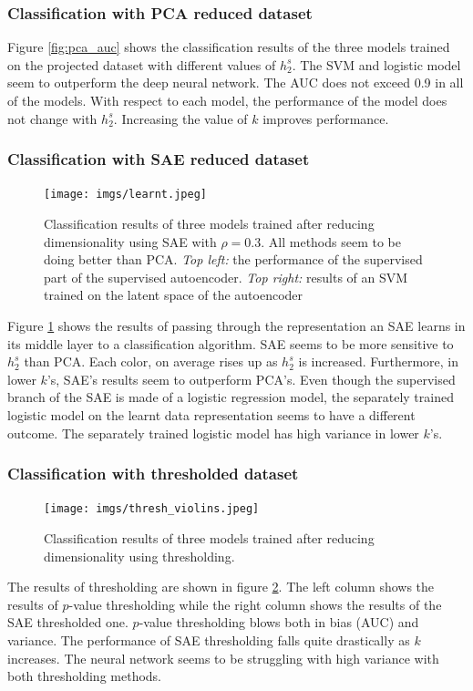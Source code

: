 \documentclass{article}
\begin{document}
\subsubsection{Classification with PCA reduced dataset}
Figure \ref{fig:pca_auc} shows the classification results of the three models trained on the projected dataset with different values of $h_2^s$. The SVM and logistic model seem to outperform the deep neural network. The AUC does not exceed 0.9 in all of the models. With respect to each model, the performance of the model does not change with $h_2^s.$ Increasing the value of $k$ improves performance. 
\subsubsection{Classification with SAE reduced dataset}
\begin{figure}[t]
    \centering
    \texttt{[image: imgs/learnt.jpeg]}
    \caption{Classification results of three models trained after reducing dimensionality using SAE with $\rho=0.3$. All methods seem to be doing better than PCA. \emph{Top left:} the performance of the supervised part of the supervised autoencoder. \emph{Top right:} results of an SVM trained on the latent space of the autoencoder}
    \label{fig:sae_auc}
\end{figure}
Figure \ref{fig:sae_auc} shows the results of passing through the representation an SAE learns in its middle layer to a classification algorithm. SAE seems to be more sensitive to $h_2^s$ than PCA. Each color, on average rises up as $h_2^s$ is increased. Furthermore, in lower $k$'s, SAE's results seem to outperform PCA's. Even though the supervised branch of the SAE is made of a logistic regression model, the separately trained logistic model on the learnt data representation seems to have a different outcome. The separately trained logistic model has high variance in lower $k$'s.

\subsubsection{Classification with thresholded dataset}
\begin{figure}[t]
    \centering
    \texttt{[image: imgs/thresh\_violins.jpeg]}
    \caption{Classification results of three models trained after reducing dimensionality using thresholding.}
    \label{fig:th_violin}
\end{figure}
The results of thresholding are shown in figure \ref{fig:th_violin}. The left column shows the results of $p$-value thresholding while the right column shows the results of the SAE thresholded one. $p$-value thresholding blows both in bias (AUC) and variance. The performance of SAE thresholding falls quite drastically as $k$ increases. The neural network seems to be struggling with high variance with both thresholding methods.
\end{document}
